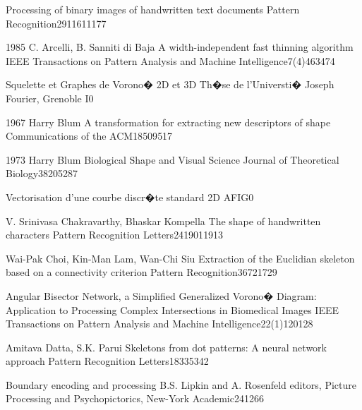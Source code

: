 

{Processing of binary images of handwritten text documents}
{Pattern Recognition}{29}{1161}{1177}

 {1985} {C. Arcelli, B. Sanniti di Baja}
{A width-independent fast thinning algorithm}
{IEEE Transactions on Pattern Analysis and Machine Intelligence}{7(4)}{463}{474}

{Squelette et Graphes de Vorono� 2D et 3D}
{Th�se de l'Universti� Joseph Fourier, Grenoble I}{}{0}{}

 {1967} {Harry Blum}
{A transformation for extracting new descriptors of shape}
{Communications of the ACM}{18}{509}{517}

 {1973} {Harry Blum}
{Biological Shape and Visual Science}
{Journal of Theoretical Biology}{38}{205}{287}

{Vectorisation d'une courbe discr�te standard 2D}
{AFIG}{}{0}{}

 { V. Srinivasa Chakravarthy, Bhaskar Kompella }
{The shape of handwritten characters}
{Pattern Recognition Letters}{24}{1901}{1913}

 {Wai-Pak Choi, Kin-Man Lam, Wan-Chi Siu}
{Extraction of the Euclidian skeleton based on a connectivity criterion}
{Pattern Recognition}{36}{721}{729}

{Angular Bisector Network, a Simplified Generalized Vorono� Diagram: Application to Processing Complex Intersections in Biomedical Images}
{IEEE Transactions on Pattern Analysis and Machine Intelligence}{22(1)}{120}{128}

 {Amitava Datta, S.K. Parui }
{Skeletons from dot patterns: A neural network approach}
{Pattern Recognition Letters}{18}{335}{342}

{Boundary encoding and processing}
{B.S. Lipkin and A. Rosenfeld editors, Picture Processing and Psychopictorics, New-York Academic}{}{241}{266}

